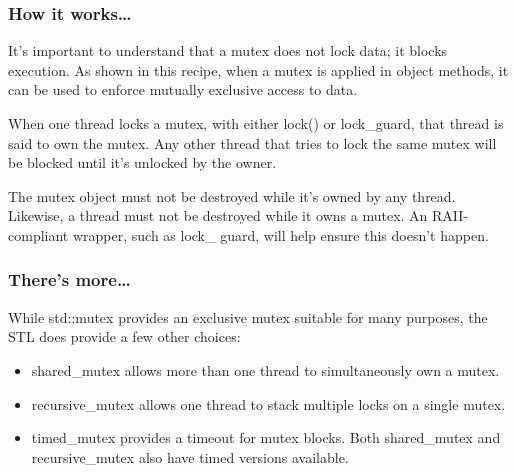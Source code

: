 \subsubsection{How it works…}

It's important to understand that a mutex does not lock data; it blocks execution. As shown in this recipe, when a mutex is applied in object methods, it can be used to enforce mutually exclusive access to data.

When one thread locks a mutex, with either lock() or lock\_guard, that thread is said to own the mutex. Any other thread that tries to lock the same mutex will be blocked until it's unlocked by the owner.

The mutex object must not be destroyed while it's owned by any thread. Likewise, a thread must not be destroyed while it owns a mutex. An RAII-compliant wrapper, such as lock\_ guard, will help ensure this doesn't happen.

\subsubsection{There's more…}

While std::mutex provides an exclusive mutex suitable for many purposes, the STL does provide a few other choices:

\begin{itemize}
\item 
shared\_mutex allows more than one thread to simultaneously own a mutex.

\item 
recursive\_mutex allows one thread to stack multiple locks on a single mutex.

\item 
timed\_mutex provides a timeout for mutex blocks. Both shared\_mutex and recursive\_mutex also have timed versions available.
\end{itemize}












